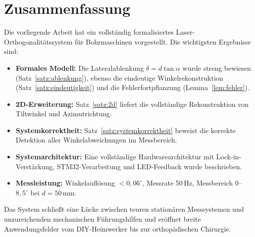 ﻿\documentclass[a4paper,12pt]{article}
\theoremstyle{definition}
\begin{document}
\section{Zusammenfassung}

Die vorliegende Arbeit hat ein vollständig formalisiertes Laser-Orthogonalitätssystem
für Bohrmaschinen vorgestellt. Die wichtigsten Ergebnisse sind:

\begin{itemize}
  \item \textbf{Formales Modell:} Die Lateralablenkung $\delta = d\tan\alpha$
    wurde streng bewiesen (Satz~\ref{satz:ablenkung}), ebenso die eindeutige
    Winkelrekonstruktion (Satz~\ref{satz:eindeutigkeit}) und die
    Fehlerfortpflanzung (Lemma~\ref{lem:fehler}).
  \item \textbf{2D-Erweiterung:} Satz~\ref{satz:2d} liefert die vollständige
    Rekonstruktion von Tilt\-winkel und Azimut\-richtung.
  \item \textbf{Systemkorrektheit:} Satz~\ref{satz:systemkorrektheit} beweist
    die korrekte Detektion aller Winkel\-abweichungen im Messbereich.
  \item \textbf{Systemarchitektur:} Eine vollständige Hardwarearchitektur mit
    Lock-in-Verstärkung, STM32-Verarbeitung und LED-Feedback wurde beschrieben.
  \item \textbf{Messleistung:} Winkel\-auflösung $< 0{,}06^\circ$, Messrate 50\,Hz,
    Messbereich $0$--$8{,}5^\circ$ bei $d = 50\,\mathrm{mm}$.
\end{itemize}

Das System schließt eine Lücke zwischen teuren stationären Messsystemen
und unzureichenden mechanischen Führungshilfen und eröffnet breite
Anwendungsfelder vom DIY-Heimwerker bis zur orthopädischen Chirurgie.
\end{document}
